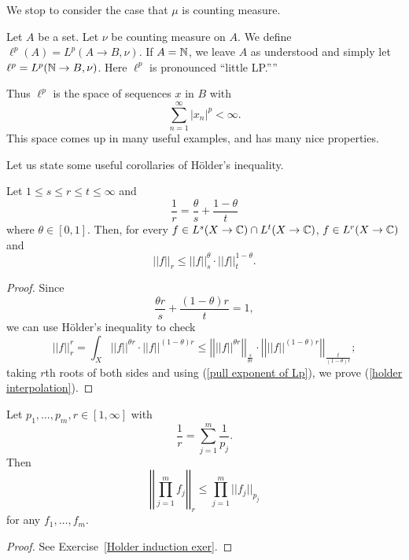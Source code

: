 We stop to consider the case that $\mu$ is counting measure.

\begin{definition}
Let $A$ be a set. Let $\nu$ be counting measure on $A$. We define $\ell^p(A) = L^p(A \to B, \nu)$.
If $A = \mathbb{N}$, we leave $A$ as understood and simply let $\ell^{p} = L^p(\mathbb{N} \to B, \nu)$.
Here $\ell^p$ is pronounced ``little LP.''''
\end{definition}

Thus $\ell^p$ is the space of sequences $x$ in $B$ with
\[\sum_{n = 1}^{\infty} |x_{n}|^{p} < \infty.\]
This space comes up in many useful examples, and has many nice properties.

Let us state some useful corollaries of H\"older's inequality.
\begin{corollary}
Let $1 \leq s \leq r \leq t \leq \infty$ and
\[\frac{1}{r} = \frac{\theta}{s} + \frac{1 - \theta}{t}\]
where $\theta \in [0, 1]$. Then, for every $f \in L^s(X \to \mathbb{C}) \cap L^t(X \to \mathbb{C})$, $f \in L^r(X \to \mathbb{C})$ and
\begin{equation}\label{holder interpolation}
||f||_{r} \leq ||f||_s^{\theta} \cdot ||f||_t^{1-\theta}.
\end{equation}
\end{corollary}
\begin{proof}
Since
\[\frac{\theta r}{s} + \frac{(1 - \theta)r}{t} = 1,\]
we can use H\"older's inequality to check
\[||f||_r^{r} = \int_{X} ||f||^{\theta r} \cdot ||f||^{(1 - \theta)r} \leq \left|\left|||f||^{\theta r}\right|\right|_{\frac{s}{\theta r}} \cdot \left|\left|||f||^{(1 - \theta) r}\right|\right|_{\frac{t}{(1 - \theta)r}};\]
taking $r$th roots of both sides and using (\ref{pull exponent of Lp}), we prove (\ref{holder interpolation}).
\end{proof}

\begin{corollary}\label{Holder induction}
Let $p_1, \dots, p_{m}, r \in [1, \infty]$ with
\[\frac{1}{r} = \sum_{j=1}^{m} \frac{1}{p_{j}}.\]
Then
\[\left|\left|\prod_{j=1}^{m} f_{j}\right|\right|_{r} \leq \prod_{j=1}^{m} ||f_{j}||_{p_{j}}\]
for any $f_1, \dots, f_{m}$.
\end{corollary}
\begin{proof}
See Exercise~\ref{Holder induction exer}.
\end{proof}

